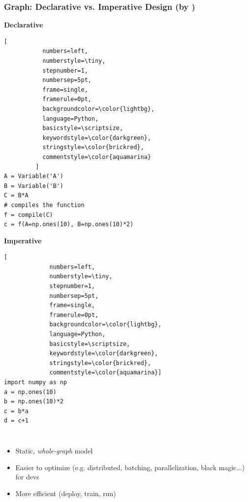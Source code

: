 \documentclass[hyperref={pdfpagelabels=false}]{beamer}
\begin{document}
     
     \begin{frame}[fragile]
       \frametitle{Graph: Declarative vs. Imperative Design (by \cite[p.191]{petuum})}

       \noindent\begin{minipage}[t]{.55\textwidth}

       \textbf{Declarative}
       \begin{lstlisting}[
           numbers=left,
           numberstyle=\tiny,
           stepnumber=1,
           numbersep=5pt,
           frame=single,
           framerule=0pt,
           backgroundcolor=\color{lightbg},
           language=Python,
           basicstyle=\scriptsize,
           keywordstyle=\color{darkgreen},
           stringstyle=\color{brickred},
           commentstyle=\color{aquamarina}
         ]
A = Variable('A')
B = Variable('B')
C = B*A
# compiles the function
f = compile(C)
c = f(A=np.ones(10), B=np.ones(10)*2)
       \end{lstlisting}
       \end{minipage}\hfill
       \begin{minipage}[t]{.35\textwidth}

         \textbf{Imperative}
         \begin{lstlisting}[
             numbers=left,
             numberstyle=\tiny,
             stepnumber=1,
             numbersep=5pt,
             frame=single,
             framerule=0pt,
             backgroundcolor=\color{lightbg},
             language=Python,
             basicstyle=\scriptsize,
             keywordstyle=\color{darkgreen},
             stringstyle=\color{brickred},
             commentstyle=\color{aquamarina}]
import numpy as np
a = np.ones(10)
b = np.ones(10)*2
c = b*a
d = c+1
         \end{lstlisting}
       \end{minipage}


       \begin{columns}[t]
         \centering
         \begin{itemize}[<.->]
         \item \small{Static, \textit{whole-graph} model}
         \item \small{Easier to optimize (e.g. distributed, batching, parallelization, black magic...) for devs}
         \item \small{More efficient (deploy, train, run)}
         \end{itemize}
         

\end{columns}
\end{frame}
\end{document}

